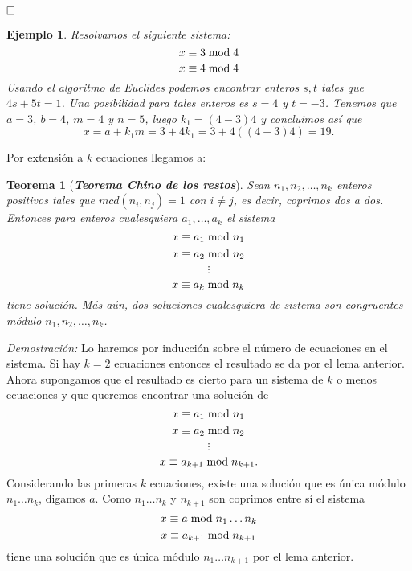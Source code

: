 \documentclass[12pt]{article}
\newtheorem{theorem}{Teorema}[section]
\newtheorem{example}{Ejemplo}[theorem]
\begin{document}
$\hfill \square$

\begin{example}Resolvamos el siguiente sistema: 
$$x \equiv 3 \hspace{0.1cm} \text{mod} \hspace{0.1cm} 4$$
$$x \equiv 4 \hspace{0.1cm} \text{mod} \hspace{0.1cm} 4$$
Usando el algoritmo de Euclides podemos encontrar enteros $s,t$ tales que $4s+5t = 1$. Una posibilidad para tales enteros es $s=4$ y $t=-3$. Tenemos que $a=3$, $b=4$, $m=4$ y $n=5$, luego $k_1 = (4-3)4$ y concluimos así que $$x=a+k_1m=3 +4k_1 = 3+4((4-3)4)=19.$$
\end{example}

Por extensión a $k$ ecuaciones llegamos a:

\begin{theorem}[\textbf{\textit{Teorema Chino de los restos}}]
Sean $n_1, n_2, \ldots, n_k$ enteros positivos tales que $mcd(n_i,n_j)=1$ con $i \neq j$, es decir, coprimos dos a dos. Entonces para enteros cualesquiera $a_1, \ldots, a_k$ el sistema 
$$x \equiv a_1 \hspace{0.1cm} \text{mod} \hspace{0.1cm} n_1$$
$$x \equiv a_2 \hspace{0.1cm} \text{mod} \hspace{0.1cm} n_2$$
$$\vdots$$
$$x \equiv a_k \hspace{0.1cm} \text{mod} \hspace{0.1cm} n_k$$
tiene solución. Más aún, dos soluciones cualesquiera de sistema son congruentes módulo $n_1, n_2, \ldots, n_k$.
\end{theorem}
\emph{Demostración: }Lo haremos por inducción sobre el número de ecuaciones en el sistema. Si hay $k=2$ ecuaciones entonces el resultado se da por el lema anterior. Ahora supongamos que el resultado es cierto para un sistema de $k$ o menos ecuaciones y que queremos encontrar una solución de 
$$x \equiv a_1 \hspace{0.1cm} \text{mod} \hspace{0.1cm} n_1$$
$$x \equiv a_2 \hspace{0.1cm} \text{mod} \hspace{0.1cm} n_2$$
$$\vdots$$
$$x \equiv a_{k+1} \hspace{0.1cm} \text{mod} \hspace{0.1cm} n_{k+1}.$$ Considerando las primeras $k$ ecuaciones, existe una solución que es única módulo $n_1 \ldots n_k$, digamos $a$. Como $n_1 \ldots n_k$ y $n_{k+1}$ son coprimos entre sí el sistema
$$x \equiv a \hspace{0.1cm} \text{mod} \hspace{0.1cm} n_1\ldots n_k$$
$$x \equiv a_{k+1} \hspace{0.1cm} \text{mod} \hspace{0.1cm} n_{k+1}$$ tiene una solución que es única módulo $n_1 \ldots n_{k+1}$ por el lema anterior.
\end{document}
